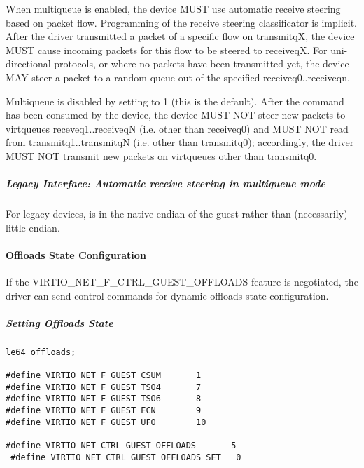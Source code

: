 When multiqueue is enabled, the device MUST use automatic receive steering
based on packet flow. Programming of the receive steering
classificator is implicit. After the driver transmitted a packet of a specific
flow on transmitqX, the device MUST cause incoming packets for this flow to
be steered to receiveqX. For uni-directional protocols, or where
no packets have been transmitted yet, the device MAY steer a packet
to a random queue out of the specified receiveq0..receiveqn.

Multiqueue is disabled by setting  to 1 (this is
the default). After the command has been consumed by the device, the
device MUST NOT steer new packets to virtqueues
receveq1..receiveqN (i.e. other than receiveq0) and MUST NOT read from
transmitq1..transmitqN (i.e. other than transmitq0); accordingly,
the driver MUST NOT transmit new packets on virtqueues other than
transmitq0.

\subparagraph{Legacy Interface: Automatic receive steering in multiqueue mode}\label{sec:Device Types / Network Device / Device Operation / Control Virtqueue / Automatic receive steering in multiqueue mode / Legacy Interface: Automatic receive steering in multiqueue mode}
For legacy devices,  is in the
native endian of the guest rather than (necessarily) little-endian.

\paragraph{Offloads State Configuration}\label{sec:Device Types / Network Device / Device Operation / Control Virtqueue / Offloads State Configuration}

If the VIRTIO_NET_F_CTRL_GUEST_OFFLOADS feature is negotiated, the driver can
send control commands for dynamic offloads state configuration.

\subparagraph{Setting Offloads State}\label{sec:Device Types / Network Device / Device Operation / Control Virtqueue / Offloads State Configuration / Setting Offloads State}

\begin{lstlisting}
le64 offloads;

#define VIRTIO_NET_F_GUEST_CSUM       1
#define VIRTIO_NET_F_GUEST_TSO4       7
#define VIRTIO_NET_F_GUEST_TSO6       8
#define VIRTIO_NET_F_GUEST_ECN        9
#define VIRTIO_NET_F_GUEST_UFO        10

#define VIRTIO_NET_CTRL_GUEST_OFFLOADS       5
 #define VIRTIO_NET_CTRL_GUEST_OFFLOADS_SET   0
\end{lstlisting}

